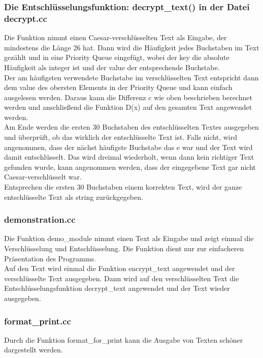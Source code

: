 \documentclass[ngerman,12pt]{article}
\begin{document}
\subsubsection*{Die Entschlüsselungsfunktion: decrypt\_text() in der Datei decrypt.cc}

Die Funktion nimmt einen Caesar-verschlüsselten Text als Eingabe, der mindestens die Länge 26 hat. Dann wird die Häufigkeit jedes Buchstaben im Text gezählt und in eine Priority Queue eingefügt, wobei der key die absolute Häufigkeit als integer ist und der value der entsprechende Buchstabe.\\
Der am häufigsten verwendete Buchstabe im verschlüsselten Text entspricht dann dem value des obersten Elements in der Priority Queue und kann einfach ausgelesen werden. Daraus kann die Differenz c wie oben beschrieben berechnet werden und anschließend die Funktion D(x) auf den gesamten Text angewendet werden.\\
Am Ende werden die ersten 30 Buchstaben des entschlüsselten Textes ausgegeben und überprüft, ob das wirklich der entschlüsselte Text ist.
Falls nicht, wird angenommen, dass der nächst häufigste Buchstabe das e war und der Text wird damit entschlüsselt. Das wird dreimal wiederholt, wenn dann kein richtiger Text gefunden wurde, kann angenommen werden, dass der eingegebene Text gar nicht Caesar-verschlüsselt war.\\
Entsprechen die ersten 30 Buchstaben einem korrekten Text, wird der ganze entschlüsselte Text als string zurückgegeben.

\subsubsection*{demonstration.cc}

Die Funktion demo\_module nimmt einen Text als Eingabe und zeigt einmal die Verschlüsselung und Entschlüsselung. Die Funktion dient nur zur einfacheren Präsentation des Programms.\\
Auf den Text wird einmal die Funktion encrypt\_text angewendet und der verschlüsselte Text ausgegeben. Dann wird auf den verschlüsselten Text die Entschlüsselungsfunktion decrypt\_text angewendet und der Text wieder ausgegeben.

\subsubsection*{format\_print.cc}

Durch die Funktion format\_for\_print kann die Ausgabe von Texten schöner dargestellt werden.
\end{document}
